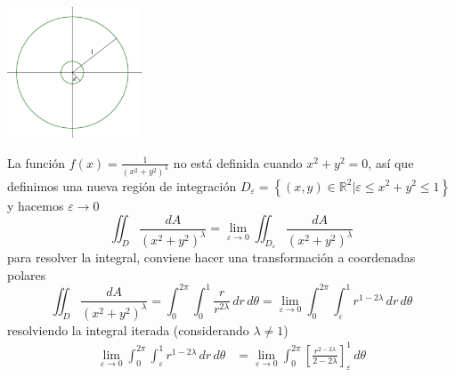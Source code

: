 \documentclass{article}
\begin{document}
\begin{enumerate}
{            \color{azul}
            \begin{center}
                \includegraphics[width=4cm]{img/ej7.png}
            \end{center}
            La función $\displaystyle f(x)=\frac{1}{(x^2+y^2)^\lambda}$ no está
            definida cuando $x^2+y^2=0$, así que definimos una nueva región de
            integración $D_\varepsilon = \left\{(x,y)\in\mathbb{R}^2 |
            \varepsilon\leq x^2+y^2\leq 1\right\}$ y hacemos $\varepsilon
            \to 0$
            \[
                \iint_D {\frac{dA}{\left(x^2+y^2\right)^\lambda}}
                =\lim_{\varepsilon\to 0}{
                    \iint_{D_\varepsilon}{
                        \frac{dA}{\left(x^2+y^2\right)^\lambda}
                    }
                }
            \]
            para resolver la integral, conviene hacer una transformación a
            coordenadas polares
            \[
                \iint_D {\frac{dA}{\left(x^2+y^2\right)^\lambda}}
                =\int_{0}^{2\pi}{
                    \int_{0}^{1}{
                        \frac{r}{r^{2\lambda}}
                    \,dr}
                \,d\theta}
                =\lim_{\varepsilon\to 0}{
                    \int_{0}^{2\pi}{
                        \int_{\varepsilon}^{1}{
                            r^{1-2\lambda}
                        \,dr}
                    \,d\theta}
                }
            \]
            resolviendo la integral iterada (considerando $\lambda \ne 1$)
            \begin{align*}
                \lim_{\varepsilon\to 0}{
                    \int_{0}^{2\pi}{
                        \int_{\varepsilon}^{1}{
                            r^{1-2\lambda}
                        \,dr}
                    \,d\theta}
                }
                &=\lim_{\varepsilon\to 0}{
                    \int_{0}^{2\pi}{
                        \left[
                            \frac{r^{2-2\lambda}}
                                 {2-2\lambda}
                        \right]_{\varepsilon}^{1}
                    \,d\theta}
                }\\[.2cm]

\end{align*}}
\end{enumerate}
\end{document}
